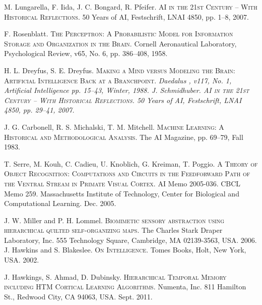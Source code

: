 \documentclass[a4paper,10pt]{article}
\begin{document}
\begin{thebibliography}{}


 M. Lungarella, F. Iida, J. C. Bongard, R. Pfeifer. \textsc{AI in the 21st
Century -- With Historical Reflections}. 50 Years of AI, Festschrift, LNAI 4850, pp. 1–8, 2007.


 F. Rosenblatt. \textsc{The Perceptron: A Probabilistic Model for Information
Storage and Organization in the Brain}. Cornell Aeronautical Laboratory, Psychological Review, v65,
No. 6, pp. 386–408, 1958.


 H. L. Dreyfus, S. E. Dreyfus. \textsc{Making a Mind versus Modeling the Brain:
Artificial Intelligence Back at a Branchpoint}. \em Daedalus \em, v117, No. 1, Artificial
Intelligence pp. 15–43, Winter, 1988.
 J. Schmidhuber. \textsc{AI in the 21st Century -- With Historical Reflections}.
50 Years of AI, Festschrift, LNAI 4850, pp. 29–41, 2007.


 J. G. Carbonell, R. S. Michalski, T. M. Mitchell. \textsc{Machine Learning: A
Historical and Methodological Analysis}. The AI Magazine, pp. 69–79, Fall 1983.


 T. Serre, M. Kouh, C. Cadieu, U. Knoblich, G. Kreiman, T. Poggio. \textsc{A Theory
of Object Recognition: Computations and Circuits in the Feedforward Path of the Ventral Stream in
Primate Visual Cortex}. AI Memo 2005-036. CBCL Memo 259. Massachusetts Institute of Technology,
Center for Biological and Computational Learning. Dec. 2005.


 J. W. Miller and P. H. Lommel. \textsc{Biomimetic sensory abstraction using
hierarchical quilted self-organizing maps}. The Charles Stark Draper Laboratory, Inc. 555 Technology
Square, Cambridge, MA 02139-3563, USA. 2006.
 J. Hawkins and S. Blakeslee. \textsc{On Intelligence}. Tomes Books, Holt,
New York, USA. 2002.


 J. Hawkings, S. Ahmad, D. Dubinsky. \textsc{Hierarchical Temporal Memory including
HTM Cortical Learning Algorithms}. Numenta, Inc. 811 Hamilton St., Redwood City, CA 94063, USA.
Sept. 2011.


\end{thebibliography}
\end{document}
